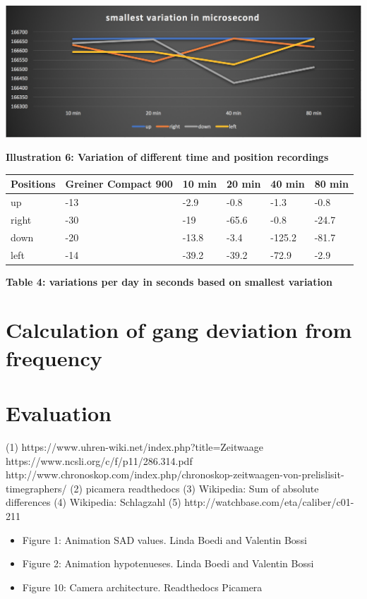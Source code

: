 \documentclass[12pt, a4paper]{report}
\begin{document}
\begin{center}
\includegraphics[scale=0.3]{Images/smallest_variation.png}

{\bf Illustration 6: Variation of different time and position recordings}
\end{center}
\begin{table}[H]
    \begin{tabular}{|l|l|l|l|l|l|}
    \hline
    Positions & Greiner Compact 900 & 10 min & 20 min & 40 min & 80 min \\ \hline
    up        & -13                 & -2.9     & -0.8     & -1.3      & -0.8      \\ \hline
    right     & -30                 & -19      & -65.6    & -0.8      & -24.7      \\ \hline
    down      & -20                 & -13.8    & -3.4     & -125.2    & -81.7      \\ \hline
    left      & -14                 & -39.2	   & -39.2	  & -72.9	  & -2.9      \\ \hline
    \end{tabular}
\end{table}
\begin{center}    
{\bf Table 4: variations per day in seconds based on smallest variation} 
\end{center}

\section{Calculation of gang deviation from frequency}

\section{Evaluation}


\glsaddall
\printglossaries

\begin{thebibliography}{9}
\bigskip
{} 
(1) https://www.uhren-wiki.net/index.php?title=Zeitwaage
 https://www.ncsli.org/c/f/p11/286.314.pdf
 http://www.chronoskop.com/index.php/chronoskop-zeitwaagen-von-prelislisit-timegraphers/
\bibitem[Picamera]
(2) picamera readthedocs
\bibitem[SAD]
(3) Wikipedia: Sum of absolute differences
\bibitem[Schlagzahl]
(4) Wikipedia: Schlagzahl
(5) http://watchbase.com/eta/caliber/c01-211
\end{thebibliography}

\pagebreak

\listoffigures
\bigskip

\begin{itemize}
\item Figure 1: Animation SAD values. Linda Boedi and Valentin Bossi
\item Figure 2: Animation hypotenueses. Linda Boedi and Valentin Bossi
\item Figure 10: Camera architecture. Readthedocs Picamera
\end{itemize}
\end{document}
